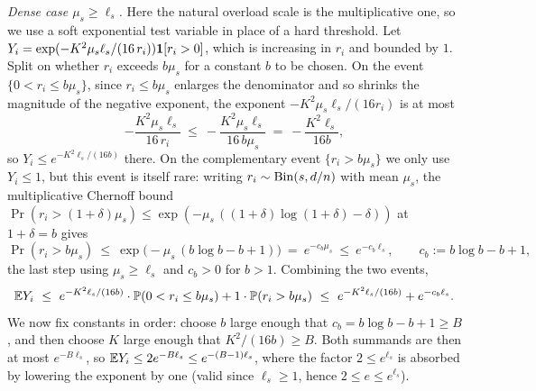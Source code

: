 \emph{Dense case $\mu_s\ge\ell_s$.} Here the natural overload scale is the multiplicative one, so we use a soft exponential
test variable in place of a hard threshold. Let $Y_i=\exp(-K^2\mu_s\ell_s/(16\,r_i))\mathbf{1}[r_i>0]$, which is increasing in
$r_i$ and bounded by $1$. Split on whether $r_i$ exceeds $b\mu_s$ for a constant $b$ to be chosen. On the event
$\{0<r_i\le b\mu_s\}$, since $r_i\le b\mu_s$ enlarges the denominator and so shrinks the magnitude of the negative exponent,
the exponent $-K^2\mu_s\ell_s/(16 r_i)$ is at most
\[
  -\frac{K^2\mu_s\ell_s}{16\,r_i}\ \le\ -\frac{K^2\mu_s\ell_s}{16\,b\mu_s}\ =\ -\frac{K^2\ell_s}{16b},
\]
so $Y_i\le e^{-K^2\ell_s/(16 b)}$ there. On the complementary event $\{r_i>b\mu_s\}$ we only use $Y_i\le 1$, but this event
is itself rare: writing $r_i\sim\mathrm{Bin}(s,d/n)$ with mean $\mu_s$, the multiplicative Chernoff bound
$\Pr(r_i>(1+\delta)\mu_s)\le\exp(-\mu_s\,((1+\delta)\log(1+\delta)-\delta))$ at $1+\delta=b$ gives
\[
  \Pr(r_i>b\mu_s)\ \le\ \exp\!\big(-\mu_s\,(b\log b-b+1)\big)\ =\ e^{-c_b\mu_s}\ \le\ e^{-c_b\ell_s},
  \qquad c_b:=b\log b-b+1,
\]
the last step using $\mu_s\ge\ell_s$ and $c_b>0$ for $b>1$. Combining the two events,
\[
  \E Y_i\ \le\ e^{-K^2\ell_s/(16b)}\cdot\Pr(0<r_i\le b\mu_s)+1\cdot\Pr(r_i>b\mu_s)\ \le\ e^{-K^2\ell_s/(16b)}+e^{-c_b\ell_s}.
\]
We now fix constants in order: choose $b$ large enough that $c_b=b\log b-b+1\ge B$, and then choose $K$ large enough that
$K^2/(16b)\ge B$. Both summands are then at most $e^{-B\ell_s}$, so $\mathbb{E} Y_i\le 2e^{-B\ell_s}\le e^{-(B-1)\ell_s}$, where the
factor $2\le e^{\ell_s}$ is absorbed by lowering the exponent by one (valid since $\ell_s\ge 1$, hence $2\le e\le e^{\ell_s}$).

